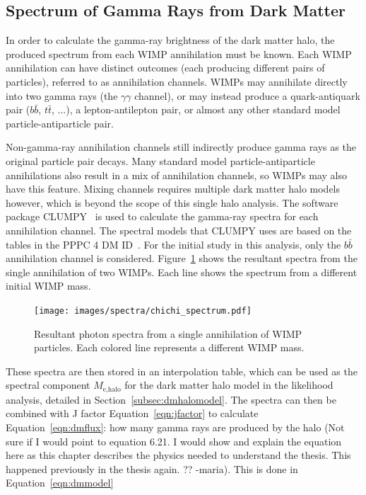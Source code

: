   
  \FloatBarrier
  
    
  \subsection{Spectrum of Gamma Rays from Dark Matter}\label{dm_spectral}
    In order to calculate the gamma-ray brightness of the dark matter halo, the produced spectrum from each WIMP annihilation must be known.
    Each WIMP annihilation can have distinct outcomes (each producing different pairs of particles), referred to as annihilation channels.
    WIMPs may annihilate directly into two gamma rays (the $\gamma\gamma$ channel), or may instead produce a quark-antiquark pair ($b\bar{b}$, $t\bar{t}$, ...), a lepton-antilepton pair, or almost any other standard model particle-antiparticle pair.

    Non-gamma-ray annihilation channels still indirectly produce gamma rays as the original particle pair decays.
    Many standard model particle-antiparticle annihilations also result in a mix of annihilation channels, so WIMPs may also have this feature.
    Mixing channels requires multiple dark matter halo models however, which is beyond the scope of this single halo analysis.
    The software package CLUMPY~\cite{CLUMPYcode} is used to calculate the gamma-ray spectra for each annihilation channel.
    The spectral models that CLUMPY uses are based on the tables in the PPPC 4 DM ID~\cite{pppc4_dm_spectra}.
    For the initial study in this analysis, only the $b\bar{b}$ annihilation channel is considered.
    Figure~\ref{fig:chichi_spectrum} shows the resultant spectra from the single annihilation of two WIMPs.
    Each line shows the spectrum from a different initial WIMP mass.

    \begin{figure}[ht]
      \centering
      \texttt{[image: images/spectra/chichi\_spectrum.pdf]}
      \caption[Single Annihilation Spectra]{
        Resultant photon spectra from a single annihilation of WIMP particles.
        Each colored line represents a different WIMP mass.}
      \label{fig:chichi_spectrum}
    \end{figure}

    These spectra are then stored in an interpolation table, which can be used as the spectral component $M_{\textrm{e,halo}}$ for the dark matter halo model in the likelihood analysis, detailed in Section~\ref{subsec:dmhalomodel}.
    The spectra can then be combined with J factor Equation~\ref{eqn:jfactor} to calculate Equation~\ref{eqn:dmflux}: how {\color{red}many gamma rays are produced by the halo (Not sure if I would point to equation 6.21. I would show  and explain the equation here as this chapter describes the physics needed to understand the thesis.  This happened previously in the thesis again. ?? -maria)}.
    This is done in Equation~\ref{eqn:dmmodel}


